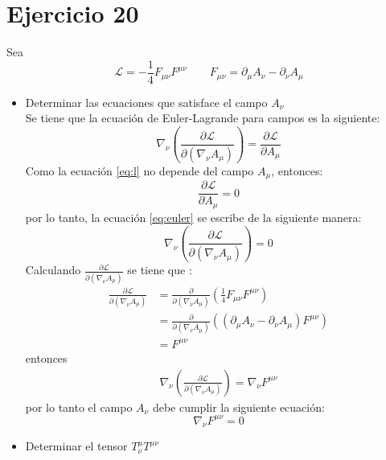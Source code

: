 \section*{Ejercicio 20}
Sea 
\begin{equation*}
    \mathcal{L } = -\frac{1}{4}F_{\mu\nu}F^{\mu\nu} \qquad F_{\mu \nu}= \partial_\mu A_\nu - \partial_\nu A_\mu
\end{equation*}
\begin{itemize}
    \item Determinar las ecuaciones que satisface el campo $A_\nu$\\
    Se tiene que la ecuación de Euler-Lagrande para campos es la siguiente:
\begin{equation}
  \nabla_\nu \left( \frac{\partial \mathcal{L}}{\partial (\nabla_\nu A_\mu)}\right) = \frac{\partial \mathcal{L}}{\partial A_\mu}
  \label{eq:euler}
\end{equation}
Como la ecuación \ref{eq:l} no depende del campo $A_\mu$, entonces:
\begin{equation*}
  \frac{\partial \mathcal{L}}{\partial A_\mu} = 0
\end{equation*}
por lo tanto, la ecuación \ref{eq:euler} se escribe de la siguiente manera:
\begin{equation}
  \nabla_\nu \left( \frac{\partial \mathcal{L}}{\partial (\nabla_\nu A_\mu)}\right) = 0
  \label{eq:euler2}
\end{equation}
Calculando $ \frac{\partial \mathcal{L}}{\partial (\nabla_\nu A_\mu)}$ se tiene que :
  \begin{align*}
    \frac{\partial \mathcal{L}}{\partial (\nabla_\nu A_\mu)} &=   \frac{\partial }{\partial (\nabla_\nu A_\mu)} \left(\frac{1}{4}F_{\mu \nu} F^{\mu \nu} \right)\\
    &= \frac{\partial }{\partial (\nabla_\nu A_\mu)}(\left(\partial_\mu A_\nu - \partial_\nu A_\mu\right) F^{\mu \nu})\\
    & = F^{\mu \nu }
  \end{align*}
  entonces
  \begin{align*}
      \nabla_\nu \left( \frac{\partial \mathcal{L}}{\partial (\nabla_\nu A_\mu)}\right)=
      \nabla_\nu F^{\mu \nu} 
  \end{align*}
  por lo tanto el campo $A_\nu$ debe cumplir la siguiente ecuación:
  \begin{equation*}
    \nabla_\nu F^{\mu \nu} =0
  \end{equation*} 
    \item Determinar el tensor $T^\mu_\nu T^{\mu\nu}$\\

\end{itemize}
